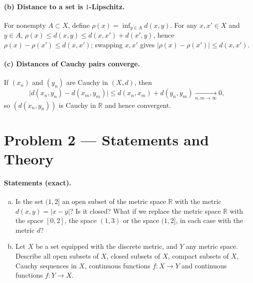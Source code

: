 \documentclass[12pt,a4paper]{article}
\theoremstyle{plain}
\theoremstyle{definition}
\theoremstyle{remark}
\theoremstyle{remark}
\begin{document}
\paragraph{(b) Distance to a set is $1$-Lipschitz.}
For nonempty $A\subset X$, define $\rho(x)=\inf_{y\in A} d(x,y)$. For any $x,x'\in X$ and $y\in A$,
$\rho(x)\le d(x,y)\le d(x,x')+d(x',y)$, hence $\rho(x)-\rho(x')\le d(x,x')$; swapping $x,x'$
gives $|\rho(x)-\rho(x')|\le d(x,x')$.

\paragraph{(c) Distances of Cauchy pairs converge.}
If $(x_n)$ and $(y_n)$ are Cauchy in $(X,d)$, then
\[
\big|d(x_n,y_n)-d(x_m,y_m)\big|\le d(x_n,x_m)+d(y_n,y_m)\xrightarrow[n,m\to\infty]{}0,
\]
so $(d(x_n,y_n))$ is Cauchy in $\mathbb R$ and hence convergent.

\bigskip
\section*{Problem 2 — Statements and Theory}

\paragraph{Statements (exact).}
\begin{enumerate}[(a)]
	\item Is the set $(1,2]$ an open subset of the metric space $\mathbb{R}$ with the metric $d(x,y)=|x-y|$? Is it closed?
	What if we replace the metric space $\mathbb{R}$ with the space $[0,2]$, the space $(1,3)$ or the space $(1,2]$, in each case with the metric $d$?
	\item Let $X$ be a set equipped with the discrete metric, and $Y$ any metric space. Describe all open subsets of $X$, closed subsets of $X$, compact subsets of $X$, Cauchy sequences in $X$, continuous functions $f:X\to Y$ and continuous functions $f:Y\to X$.
\end{enumerate}
\end{document}
